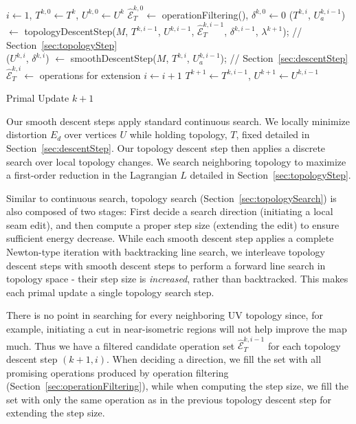 \begin{algorithm}[h]
\SetAlgoLined
{}
$i \leftarrow 1$, $T^{k,0} \leftarrow T^{k}$, $U^{k,0} \leftarrow U^{k}$\;
$\hat{\mathcal{E}}^{k,0}_T \leftarrow$ operationFiltering(), $\delta^{k,0} \leftarrow 0$\;
{
	($T^{k,i}$, $U_a^{k,i-1}$) $\leftarrow$ topologyDescentStep($M$, $T^{k,i-1}$, $U^{k,i-1}$, $\hat{\mathcal{E}}^{k,i-1}_T$, $\delta^{k,i-1}$, $\lambda^{k+1}$); // Section~\ref{sec:topologyStep}\\
	($U^{k,i}$, $\delta^{k,i}$) $\leftarrow$ smoothDescentStep($M$, $T^{k,i}$, $U_a^{k,i-1}$); // Section~\ref{sec:descentStep}\\
	$\hat{\mathcal{E}}^{k,i}_T \leftarrow$ operations for extension\;
	$i \leftarrow i+1$\;
}
$T^{k+1} \leftarrow T^{k,i-1}$, $U^{k+1} \leftarrow U^{k,i-1}$
\caption{Primal Update $k+1$}
\label{alg:DCSearch}
\end{algorithm}

Our smooth descent steps apply standard continuous search. We locally minimize distortion $E_d$ over vertices $U$ while holding topology, $T$, fixed detailed in Section~\ref{sec:descentStep}.
%
Our topology descent step then applies a discrete search over local topology changes. We search neighboring topology to maximize a first-order reduction in the Lagrangian $L$ detailed in Section~\ref{sec:topologyStep}.

Similar to continuous search, topology search (Section~\ref{sec:topologySearch}) is also composed of two stages: First decide a search direction (initiating a local seam edit), and then compute a proper step size (extending the edit) to ensure sufficient energy decrease. While each smooth descent step applies a complete Newton-type iteration with backtracking line search, we interleave topology descent steps with smooth descent steps to perform a forward line search in topology space - their step size is \emph{increased}, rather than backtracked. This makes each primal update a single topology search step.

There is no point in searching for every neighboring UV topology since, for example, initiating a cut in near-isometric regions will not help improve the map much. Thus we have a filtered candidate operation set $\hat{\mathcal{E}}^{k,i-1}_T$ for each topology descent step $(k+1,i)$. When deciding a direction, we fill the set with all promising operations produced by operation filtering (Section~\ref{sec:operationFiltering}), while when computing the step size, we fill the set with only the same operation as in the previous topology descent step for extending the step size.

